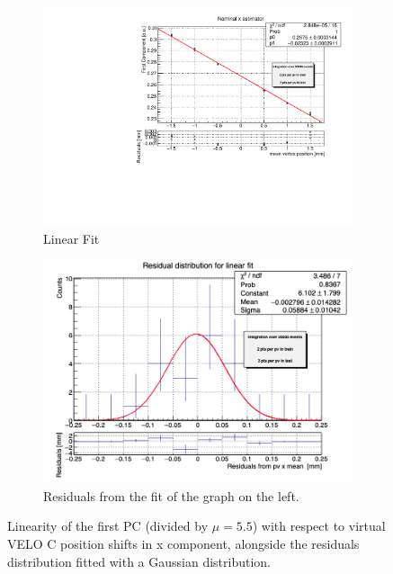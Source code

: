 \begin{samepage}
\begin{figure}
    \centering
    \begin{subfigure}{0.48\textwidth}
    \includegraphics[width=\linewidth]{figures/x_fit_veloC_MC_normalised.pdf}
    \caption{Linear Fit}\label{fig:x_veloC_fit_MC}
    \end{subfigure}
    \begin{subfigure}{0.48\textwidth}
    \includegraphics[width=\linewidth]{figures/x_res_veloC_MC.png}
    \caption{Residuals from the fit of the graph on the left. }\label{fig:x_veloC_res_MC}
    \end{subfigure}
    \caption{Linearity of the first PC (divided by $\mu=5.5$) with respect to  virtual VELO C position shifts in x component, alongside the residuals distribution fitted with a Gaussian distribution.}

\end{figure}
\end{samepage}
